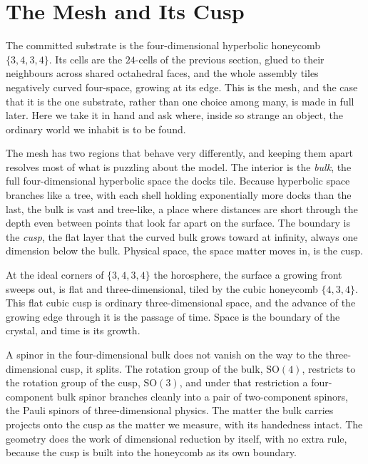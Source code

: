 \section{The Mesh and Its Cusp}

The committed substrate is the four-dimensional hyperbolic honeycomb $\{3,4,3,4\}$. Its cells are the $24$-cells of the previous section, glued to their neighbours across shared octahedral faces, and the whole assembly tiles negatively curved four-space, growing at its edge. This is the mesh, and the case that it is the one substrate, rather than one choice among many, is made in full later. Here we take it in hand and ask where, inside so strange an object, the ordinary world we inhabit is to be found.

The mesh has two regions that behave very differently, and keeping them apart resolves most of what is puzzling about the model. The interior is the \emph{bulk}, the full four-dimensional hyperbolic space the docks tile. Because hyperbolic space branches like a tree, with each shell holding exponentially more docks than the last, the bulk is vast and tree-like, a place where distances are short through the depth even between points that look far apart on the surface. The boundary is the \emph{cusp}, the flat layer that the curved bulk grows toward at infinity, always one dimension below the bulk. Physical space, the space matter moves in, is the cusp.

\begin{result}
At the ideal corners of $\{3,4,3,4\}$ the horosphere, the surface a growing front sweeps out, is flat and three-dimensional, tiled by the cubic honeycomb $\{4,3,4\}$. This flat cubic cusp is ordinary three-dimensional space, and the advance of the growing edge through it is the passage of time. Space is the boundary of the crystal, and time is its growth.
\end{result}

A spinor in the four-dimensional bulk does not vanish on the way to the three-dimensional cusp, it splits. The rotation group of the bulk, $\mathrm{SO}(4)$, restricts to the rotation group of the cusp, $\mathrm{SO}(3)$, and under that restriction a four-component bulk spinor branches cleanly into a pair of two-component spinors, the Pauli spinors of three-dimensional physics. The matter the bulk carries projects onto the cusp as the matter we measure, with its handedness intact. The geometry does the work of dimensional reduction by itself, with no extra rule, because the cusp is built into the honeycomb as its own boundary.

